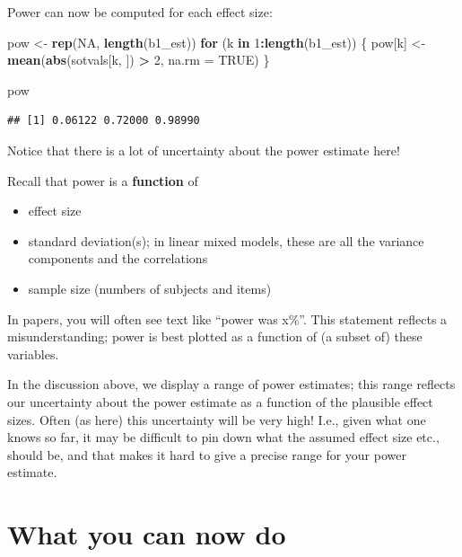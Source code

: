 \documentclass[12pt,]{krantz}
\newenvironment{Shaded}{\begin{snugshade}}{\end{snugshade}}
\newcommand{\ControlFlowTok}[1]{\textcolor[rgb]{0.13,0.29,0.53}{\textbf{#1}}}
\newcommand{\DataTypeTok}[1]{\textcolor[rgb]{0.13,0.29,0.53}{#1}}
\newcommand{\DecValTok}[1]{\textcolor[rgb]{0.00,0.00,0.81}{#1}}
\newcommand{\KeywordTok}[1]{\textcolor[rgb]{0.13,0.29,0.53}{\textbf{#1}}}
\newcommand{\NormalTok}[1]{#1}
\newcommand{\OperatorTok}[1]{\textcolor[rgb]{0.81,0.36,0.00}{\textbf{#1}}}
\newcommand{\OtherTok}[1]{\textcolor[rgb]{0.56,0.35,0.01}{#1}}
\newcommand{\StringTok}[1]{\textcolor[rgb]{0.31,0.60,0.02}{#1}}
\providecommand{\tightlist}{%
  \setlength{\itemsep}{0pt}\setlength{\parskip}{0pt}}
\begin{document}
Power can now be computed for each effect size:

\begin{Shaded}
\begin{Highlighting}[]
\NormalTok{pow <-}\StringTok{ }\KeywordTok{rep}\NormalTok{(}\OtherTok{NA}\NormalTok{, }\KeywordTok{length}\NormalTok{(b1_est))}
\ControlFlowTok{for}\NormalTok{ (k }\ControlFlowTok{in} \DecValTok{1}\OperatorTok{:}\KeywordTok{length}\NormalTok{(b1_est)) \{}
\NormalTok{  pow[k] <-}\StringTok{ }\KeywordTok{mean}\NormalTok{(}\KeywordTok{abs}\NormalTok{(sotvals[k, ]) }\OperatorTok{>}\StringTok{ }\DecValTok{2}\NormalTok{, }\DataTypeTok{na.rm =} \OtherTok{TRUE}\NormalTok{)}
\NormalTok{\}}

\NormalTok{pow}
\end{Highlighting}
\end{Shaded}

\begin{verbatim}
## [1] 0.06122 0.72000 0.98990
\end{verbatim}

Notice that there is a lot of uncertainty about the power estimate here!

Recall that power is a \textbf{function} of

\begin{itemize}
\tightlist
\item
  effect size
\item
  standard deviation(s); in linear mixed models, these are all the variance components and the correlations
\item
  sample size (numbers of subjects and items)
\end{itemize}

In papers, you will often see text like ``power was x\%''. This statement reflects a misunderstanding; power is best plotted as a function of (a subset of) these variables.

In the discussion above, we display a range of power estimates; this range reflects our uncertainty about the power estimate as a function of the plausible effect sizes. Often (as here) this uncertainty will be very high! I.e., given what one knows so far, it may be difficult to pin down what the assumed effect size etc., should be, and that makes it hard to give a precise range for your power estimate.

\hypertarget{what-you-can-now-do}{%
\section{What you can now do}\label{what-you-can-now-do}}
\end{document}

